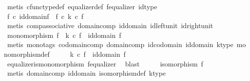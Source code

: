 \begin{isabellebody}
\ {\isacharparenleft}{\kern0pt}metis\ cfunc{\isacharunderscore}{\kern0pt}type{\isacharunderscore}{\kern0pt}def\ equalizer{\isacharunderscore}{\kern0pt}def\ f{\isacharunderscore}{\kern0pt}equalizer\ id{\isacharunderscore}{\kern0pt}type{\isacharparenright}{\kern0pt}\isanewline
\ \ \isamarkupfalse%
\ \isamarkupfalse%
\ {\isachardoublequoteopen}f\ {\isasymcirc}\isactrlsub c\ id{\isacharparenleft}{\kern0pt}domain{\isacharparenleft}{\kern0pt}f{\isacharparenright}{\kern0pt}{\isacharparenright}{\kern0pt}\ {\isacharequal}{\kern0pt}\ f\ {\isasymcirc}\isactrlsub c\ {\isacharparenleft}{\kern0pt}k\ {\isasymcirc}\isactrlsub c\ f{\isacharparenright}{\kern0pt}{\isachardoublequoteclose}\isanewline
\ \ \ \ \isamarkupfalse%
\ {\isacharparenleft}{\kern0pt}metis\ comp{\isacharunderscore}{\kern0pt}associative\ domain{\isacharunderscore}{\kern0pt}comp\ id{\isacharunderscore}{\kern0pt}domain\ id{\isacharunderscore}{\kern0pt}left{\isacharunderscore}{\kern0pt}unit\ id{\isacharunderscore}{\kern0pt}right{\isacharunderscore}{\kern0pt}unit{\isacharparenright}{\kern0pt}\isanewline
\ \ \isamarkupfalse%
\ \isamarkupfalse%
\ {\isachardoublequoteopen}monomorphism\ f\ {\isasymLongrightarrow}\ k\ {\isasymcirc}\isactrlsub c\ f\ {\isacharequal}{\kern0pt}\ id{\isacharparenleft}{\kern0pt}domain\ f{\isacharparenright}{\kern0pt}{\isachardoublequoteclose}\isanewline
\ \ \ \ \isamarkupfalse%
\ {\isacharparenleft}{\kern0pt}metis\ {\isacharparenleft}{\kern0pt}mono{\isacharunderscore}{\kern0pt}tags{\isacharparenright}{\kern0pt}\ codomain{\isacharunderscore}{\kern0pt}comp\ domain{\isacharunderscore}{\kern0pt}comp\ id{\isacharunderscore}{\kern0pt}codomain\ id{\isacharunderscore}{\kern0pt}domain\ k{\isacharunderscore}{\kern0pt}type\ monomorphism{\isacharunderscore}{\kern0pt}def{\isacharparenright}{\kern0pt}\isanewline
\ \ \isamarkupfalse%
\ \isamarkupfalse%
\ {\isachardoublequoteopen}k\ {\isasymcirc}\isactrlsub c\ f\ {\isacharequal}{\kern0pt}\ id{\isacharparenleft}{\kern0pt}domain\ f{\isacharparenright}{\kern0pt}{\isachardoublequoteclose}\isanewline
\ \ \ \ \isamarkupfalse%
\ equalizer{\isacharunderscore}{\kern0pt}is{\isacharunderscore}{\kern0pt}monomorphism\ f{\isacharunderscore}{\kern0pt}equalizer\ \isamarkupfalse%
\ blast\isanewline
\ \ \isamarkupfalse%
\ \isamarkupfalse%
\ {\isachardoublequoteopen}isomorphism\ f{\isachardoublequoteclose}\isanewline
\ \ \ \ \isamarkupfalse%
\ {\isacharparenleft}{\kern0pt}metis\ domain{\isacharunderscore}{\kern0pt}comp\ id{\isacharunderscore}{\kern0pt}domain\ isomorphism{\isacharunderscore}{\kern0pt}def\ k{\isacharunderscore}{\kern0pt}type{\isacharparenright}{\kern0pt}\ \ \isanewline

\end{isabellebody}
